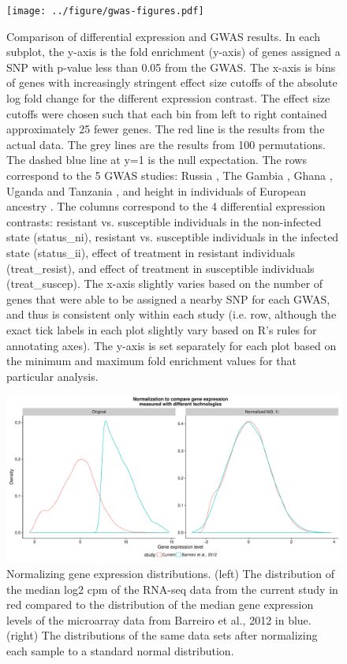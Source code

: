 \documentclass[fleqn,10pt]{wlscirep}
\begin{document}
\begin{figure}[ht]
\centering
\texttt{[image: ../figure/gwas-figures.pdf]}
\caption{
Comparison of differential expression and GWAS results. In each
subplot, the y-axis is the fold enrichment (y-axis) of genes assigned
a SNP with p-value less than 0.05 from the GWAS. The x-axis is bins of
genes with increasingly stringent effect size cutoffs of the absolute
log fold change for the different expression contrast. The effect size
cutoffs were chosen such that each bin from left to right contained
approximately 25 fewer genes. The red line is the results from the
actual data. The grey lines are the results from 100 permutations. The
dashed blue line at y=1 is the null expectation. The rows correspond
to the 5 GWAS studies: Russia \cite{Curtis2015}, The Gambia
\cite{Thye2010}, Ghana \cite{Thye2010}, Uganda and Tanzania
\cite{Sobota2016}, and height in individuals of European ancestry
\cite{LangoAllen2010}. The columns correspond to the 4 differential
expression contrasts: resistant vs. susceptible individuals in the
non-infected state (status\_ni), resistant vs. susceptible individuals
in the infected state (status\_ii), effect of treatment in resistant
individuals (treat\_resist), and effect of treatment in susceptible
individuals (treat\_suscep). The x-axis slightly varies based on the
number of genes that were able to be assigned a nearby SNP for each
GWAS, and thus is consistent only within each study (i.e. row,
although the exact tick labels in each plot slightly vary based on R’s
rules for annotating axes). The y-axis is set separately for each plot
based on the minimum and maximum fold enrichment values for that
particular analysis.
}
\label{fig:gwas-supp}
\end{figure}

\begin{figure}[ht]
\centering
\includegraphics[width=\linewidth]{../figure/combined-distributions.pdf}
\caption{
Normalizing gene expression distributions. (left) The distribution of
the median log2 cpm of the RNA-seq data from the current study in red
compared to the distribution of the median gene expression levels of
the microarray data from Barreiro et al., 2012 \cite{Barreiro2012} in
blue. (right) The distributions of the same data sets after
normalizing each sample to a standard normal distribution.
}
\label{fig:combined-dist}
\end{figure}
\end{document}
